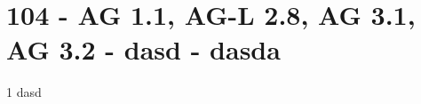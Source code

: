 \section{104 - AG 1.1, AG-L 2.8, AG 3.1, AG 3.2 - dasd - dasda}

\begin{langesbeispiel}\item[1] %
dasd

\end{langesbeispiel}